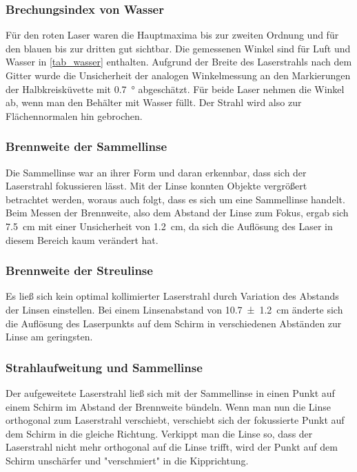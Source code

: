 \documentclass[
	a4paper,
	12pt,
	pagesize,
	ngerman
]{scrartcl}
\begin{document}
	\subsubsection{Brechungsindex von Wasser}
	Für den roten Laser waren die Hauptmaxima bis zur zweiten Ordnung und für den blauen bis zur dritten gut sichtbar.
	Die gemessenen Winkel sind für Luft und Wasser in \cref{tab_wasser} enthalten.
	Aufgrund der Breite des Laserstrahls nach dem Gitter wurde die Unsicherheit der analogen Winkelmessung an den Markierungen der Halbkreisküvette mit \SI{0,7}{\degree} abgeschätzt.
	Für beide Laser nehmen die Winkel ab, wenn man den Behälter mit Wasser füllt.
	Der Strahl wird also zur Flächennormalen hin gebrochen.
	\subsubsection{Brennweite der Sammellinse}
	Die Sammellinse war an ihrer Form und daran erkennbar, dass sich der Laserstrahl fokussieren lässt.
	Mit der Linse konnten Objekte vergrößert betrachtet werden, woraus auch folgt, dass es sich um eine Sammellinse handelt.%
	Beim Messen der Brennweite, also dem Abstand der Linse zum Fokus, ergab sich \SI{7,5}{cm} mit einer Unsicherheit von \SI{1,2}{cm}, da sich die Auflösung des Laser in diesem Bereich kaum verändert hat. 
	\subsubsection{Brennweite der Streulinse}
	Es ließ sich kein optimal kollimierter Laserstrahl durch Variation des Abstands der Linsen einstellen.
	Bei einem Linsenabstand von \SI{10,7 +- 1,2}{cm} änderte sich die Auflösung des Laserpunkts auf dem Schirm in verschiedenen Abständen zur Linse am geringsten.
	\subsubsection{Strahlaufweitung und Sammellinse}
	Der aufgeweitete Laserstrahl ließ sich mit der Sammellinse in einen Punkt auf einem Schirm im Abstand der Brennweite bündeln.
	Wenn man nun die Linse orthogonal zum Laserstrahl verschiebt, verschiebt sich der fokussierte Punkt auf dem Schirm in die gleiche Richtung.
	Verkippt man die Linse so, dass der Laserstrahl nicht mehr orthogonal auf die Linse trifft, wird der Punkt auf dem Schirm unschärfer und "verschmiert" in die Kipprichtung.

\end{document}
